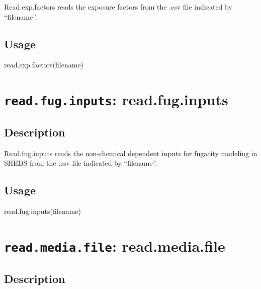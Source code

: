 \documentclass[
]{article}
\newenvironment{Shaded}{\begin{snugshade}}{\end{snugshade}}
\newcommand{\FunctionTok}[1]{\textcolor[rgb]{0.00,0.00,0.00}{#1}}
\newcommand{\NormalTok}[1]{#1}
\begin{document}
Read.exp.factors reads the exposure factors from the .csv file indicated
by ``filename''.

\hypertarget{usage-38}{%
\subsection{Usage}\label{usage-38}}

\begin{Shaded}
\begin{Highlighting}[]
\FunctionTok{read.exp.factors}\NormalTok{(filename)}
\end{Highlighting}
\end{Shaded}

\hypertarget{read.fug.inputs-read.fug.inputs}{%
\section{\texorpdfstring{\texttt{read.fug.inputs}:
read.fug.inputs}{read.fug.inputs: read.fug.inputs}}\label{read.fug.inputs-read.fug.inputs}}

\hypertarget{description-39}{%
\subsection{Description}\label{description-39}}

Read.fug.inputs reads the non-chemical dependent inputs for fugacity
modeling in SHEDS from the .csv file indicated by ``filename''.

\hypertarget{usage-39}{%
\subsection{Usage}\label{usage-39}}

\begin{Shaded}
\begin{Highlighting}[]
\FunctionTok{read.fug.inputs}\NormalTok{(filename)}
\end{Highlighting}
\end{Shaded}

\hypertarget{read.media.file-read.media.file}{%
\section{\texorpdfstring{\texttt{read.media.file}:
read.media.file}{read.media.file: read.media.file}}\label{read.media.file-read.media.file}}

\hypertarget{description-40}{%
\subsection{Description}\label{description-40}}
\end{document}
